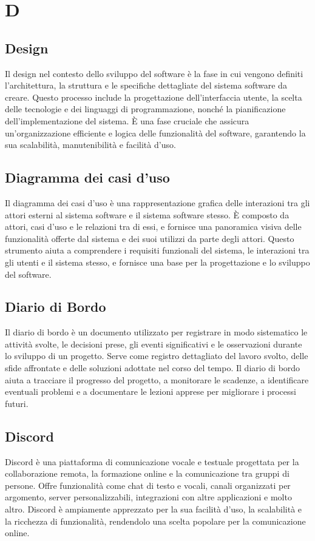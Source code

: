 \section{D} 
\subsection{Design} 
Il design nel contesto dello sviluppo del software è la fase in cui vengono definiti l'architettura, la struttura e le specifiche dettagliate del sistema software da creare. Questo processo include la progettazione dell'interfaccia utente, la scelta delle tecnologie e dei linguaggi di programmazione, nonché la pianificazione dell'implementazione del sistema. È una fase cruciale che assicura un'organizzazione efficiente e logica delle funzionalità del software, garantendo la sua scalabilità, manutenibilità e facilità d'uso.
\subsection{Diagramma dei casi d'uso} 
Il diagramma dei casi d'uso è una rappresentazione grafica delle interazioni tra gli attori esterni al sistema software e il sistema software stesso. È composto da attori, casi d'uso e le relazioni tra di essi, e fornisce una panoramica visiva delle funzionalità offerte dal sistema e dei suoi utilizzi da parte degli attori. Questo strumento aiuta a comprendere i requisiti funzionali del sistema, le interazioni tra gli utenti e il sistema stesso, e fornisce una base per la progettazione e lo sviluppo del software.
\subsection{Diario di Bordo} 
Il diario di bordo è un documento utilizzato per registrare in modo sistematico le attività svolte, le decisioni prese, gli eventi significativi e le osservazioni durante lo sviluppo di un progetto. Serve come registro dettagliato del lavoro svolto, delle sfide affrontate e delle soluzioni adottate nel corso del tempo. Il diario di bordo aiuta a tracciare il progresso del progetto, a monitorare le scadenze, a identificare eventuali problemi e a documentare le lezioni apprese per migliorare i processi futuri.
\subsection{Discord} 
Discord è una piattaforma di comunicazione vocale e testuale progettata per la collaborazione remota, la formazione online e la comunicazione tra gruppi di persone. Offre funzionalità come chat di testo e vocali, canali organizzati per argomento, server personalizzabili, integrazioni con altre applicazioni e molto altro. Discord è ampiamente apprezzato per la sua facilità d'uso, la scalabilità e la ricchezza di funzionalità, rendendolo una scelta popolare per la comunicazione online.
